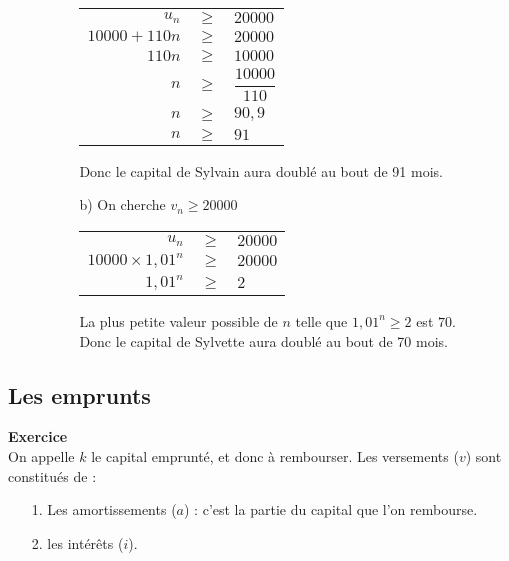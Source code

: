 \begin{itemize}
\begin{itemize}
\begin{itemize}
\begin{tabular}{rll}
$u_n$ & $ \geqslant $ & $ 20 000$ \\
$10 000 + 110n$ & $\geq$ & $20 000$ \\
$110n$ & $\geq$ & $10 000$ \\
$n$ & $\geq$ & $\dfrac{10 000}{110}$ \\
$n$ & $\geq$ & $90,9$ \\
$n$ & $\geq$ & $91$ \vspace*{.3cm}\\
\end{tabular} 

Donc le capital de Sylvain aura doublé au bout de 91 mois. \\

\item[b)] On cherche $v_n \geqslant 20 000$ \\
\begin{tabular}{rll}
$u_n$ & $ \geqslant $ & $ 20 000$ \\
$10 000 \times 1,01^n$ & $\geq$ & $20 000$ \\
$1,01^n$ & $\geq$ & $2$ \vspace*{.3cm} \\
\end{tabular} 

La plus petite valeur possible de $n$ telle que $1,01^n \geqslant 2$ est $70$. \\

Donc le capital de Sylvette aura doublé au bout de 70 mois.
\end{itemize}
\end{itemize}
\end{itemize}

\newpage

\vspace*{-.5cm}

\subsection{Les emprunts}

\textbf{Exercice} \\

On appelle $k$ le capital emprunté, et donc à rembourser. Les versements ($v$) sont constitués de :

\begin{itemize}
\item[1.] Les amortissements ($a$) : c'est la partie du capital que l'on rembourse.
\item[2.] les intérêts ($i$). 
\end{itemize}

